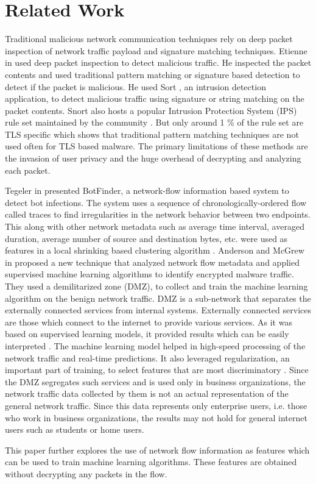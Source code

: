 \chapter{Related Work\label{chap:related}}

Traditional malicious network communication techniques rely on deep packet inspection of network traffic payload and signature matching techniques. Etienne in \cite{Etienne} used deep packet inspection to detect malicious traffic. He inspected the packet contents and used traditional pattern matching or signature based detection to detect if the packet is malicious. He used Sort \cite{Snort}, an intrusion detection application, to detect malicious traffic using signature or string matching on the packet contents. Snort also hosts a popular Intrusion Protection System (IPS) rule set maintained by the community \cite{SnortCR}. But only around 1 \% of the rule set are TLS specific which shows that traditional pattern matching techniques are not used often for TLS based malware. The primary limitations of these methods are the invasion of user privacy and the huge overhead of decrypting and analyzing each packet.

Tegeler \etal in \cite{TegelerFVK12} presented BotFinder, a network-flow information based system to detect bot infections. The system uses a sequence of chronologically-ordered flow called traces to find irregularities in the network behavior between two endpoints. This along with other network metadata such as average time interval, averaged duration, average number of source and destination bytes, etc. were used as features in a local shrinking based clustering algorithm \cite{WangQZ07}. Anderson and McGrew in \cite{AndersonM17} proposed a new technique that analyzed network flow metadata and applied supervised machine learning algorithms to identify encrypted malware traffic. They used a demilitarized zone (DMZ), to collect and train the machine learning algorithm on the benign network traffic. DMZ is a sub-network that separates the externally connected services from internal systems. Externally connected services are those which connect to the internet to provide various services. As it was based on supervised learning models, it provided results which can be easily interpreted \cite{SommerP10}. The machine learning model helped in high-speed processing of the network traffic and real-time predictions. It also leveraged regularization, an important part of training, to select features that are most discriminatory \cite{HastieTF09}. Since the DMZ segregates such services and is used only in business organizations, the network traffic data collected by them is not an actual representation of the general network traffic. Since this data represents only enterprise users, i.e. those who work in business organizations, the results may not hold for general internet users such as students or home users.

This paper further explores the use of network flow information as features which can be used to train machine learning algorithms. These features are obtained without decrypting any packets in the flow.
